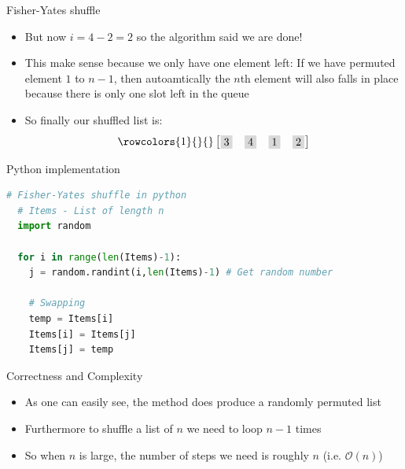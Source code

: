 \documentclass[10pt,xcolor={table,dvipsnames},t]{beamer}
\begin{document}
\begin{frame}{Fisher-Yates shuffle}
  \begin{itemize}
    \item But now $i=4-2=2$ so the algorithm said we are done! 
    \item This make sense because we only have one element left: If we have permuted element $1$ to $n-1$, then autoamtically the $n$th element will also falls in place because there is only one slot left in the queue 
    \item So finally our shuffled list is:
    \begin{gather*}
      \rowcolors{1}{}{}
      \begin{bmatrix}
        \fcolorbox{black!0}{gray!30}{$3$} & \fcolorbox{black!0}{gray!30}{$4$} & \fcolorbox{black!0}{gray!30}{$1$} & \fcolorbox{black!0}{gray!30}{$2$}
      \end{bmatrix}
    \end{gather*}
  \end{itemize}
\end{frame}


\begin{frame}[fragile]{Python implementation}
  \begin{lstlisting}[language=python]
  # Fisher-Yates shuffle in python 
  # Items - List of length n
  import random
  
  for i in range(len(Items)-1):
    j = random.randint(i,len(Items)-1) # Get random number 
    
    # Swapping 
    temp = Items[i]
    Items[i] = Items[j]
    Items[j] = temp
  \end{lstlisting}
  \end{frame}  

\begin{frame}{Correctness and Complexity}
  \begin{itemize}
    \item As one can easily see, the method does produce a randomly permuted list
    \item Furthermore to shuffle a list of $n$ we need to loop $n-1$ times 
    \item So when $n$ is large, the number of steps we need is roughly $n$ (i.e. $\mathcal{O}(n)$)
  \end{itemize}
\end{frame}
\end{document}
